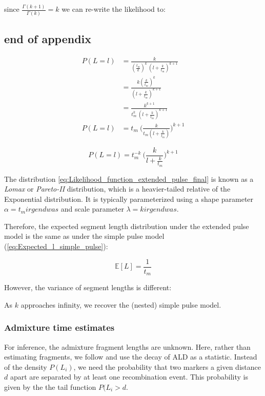 \documentclass[]{article}
\begin{document}
since $\frac{\Gamma(k+1)}{\Gamma(k)} =k$ we can re-write the likelihood to:

\subsection{end of appendix }
\begin{equation}
\begin{split}
\label{eq:Likelihood_function_extended_pulse_final}
    P(L=l) &= \frac{k}{(\frac{t_m}{k})^k \ (l+\frac{k}{t_m})^{k+1}} \\
    &= \frac{k(\frac{k}{t_m})^k} {(l+\frac{k}{t_{m}})^{k+1}}  \\
    &= \frac{k^{k+1}} { t_{m}^k \ (l+\frac{k}{t_{m}})^{k+1}}  \\
    P(L=l) &= t_{m} \ \Bigg( \frac{k}{t_{m}(l+\frac{k}{t_{m}})}\Bigg)^{k+1}
\end{split}
\end{equation}

\begin{equation}
    P(L=l) = t_{m}^{-k} \ \Bigg( \frac{k}{l+\frac{k}{t_{m}}}\Bigg)^{k+1}
\end{equation}

The distribution  \ref{eq:Likelihood_function_extended_pulse_final} is known as a \emph{Lomax} or \emph{Pareto-II} distribution, which is a heavier-tailed relative of the Exponential distribution. It is typically parameterized using a shape parameter $\alpha=t_m irgendwas$ and scale parameter $\lambda = k irgendwas$. 

Therefore, the expected segment length distribution under the extended pulse model is the same as under the simple pulse model (\ref{eq:Expected_l_simple_pulse}):

\begin{equation}
\label{eq:Expected_l_extended_pulse}
\mathbb{E}[L] = \frac{1}{t_{m}}
\end{equation}

However, the variance of segment lengths is different:


As $k$ approaches infinity, we recover the (nested) simple pulse model.



\subsubsection{Admixture time estimates}\label{admixture time estimates}
For inference, the admixture fragment lengths are unknown. Here, rather than estimating fragments, we follow \cite{moorjani_history_2011} and use the decay of ALD  as a statistic. Instead of the density $P(L_i)$, we need the probability that two markers a given distance $d$ apart are separated by at least one recombination event. This probability is given by the the tail function $P(L_i > d$.
\end{document}
